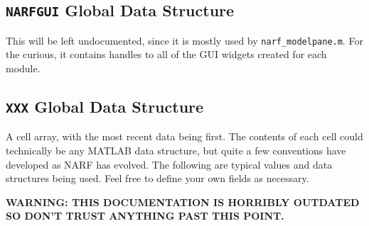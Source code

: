 \documentclass[letterpaper]{report}
\newcommand{\matlab}[1]{\texttt{#1}}
\begin{document}
\subsection{\matlab{NARFGUI} Global Data Structure}

This will be left undocumented, since it is mostly used by \matlab{narf\_modelpane.m}. For the curious, it contains handles to all of the GUI widgets created for each module. 























\subsection{\matlab{XXX} Global Data Structure}

  A cell array, with the most recent data being first. The contents of each cell could technically be any MATLAB data structure, but quite a few conventions have developed as NARF has evolved. The following are typical values and data structures being used. Feel free to define your own fields as necessary.
 
  \textbf{WARNING: THIS DOCUMENTATION IS HORRIBLY OUTDATED SO DON'T TRUST ANYTHING PAST THIS POINT.}
\end{document}
